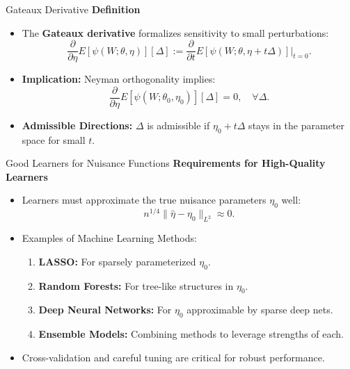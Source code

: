 \documentclass[xcolor=svgnames,t]{beamer}
\begin{document}
                        \begin{frame}{Gateaux Derivative}
                        \textbf{Definition}
                        \begin{itemize}
                            \item The \textbf{Gateaux derivative} formalizes sensitivity to small perturbations:
                            \[
                            \frac{\partial}{\partial \eta} E[\psi(W; \theta, \eta)][\Delta] := \frac{\partial}{\partial t} E[\psi(W; \theta, \eta + t\Delta)]\bigg|_{t=0}.
                            \]
                            \pause
                            \item \textbf{Implication:} Neyman orthogonality implies:
                            \[
                            \frac{\partial}{\partial \eta} E[\psi(W; \theta_0, \eta_0)][\Delta] = 0, \quad \forall \Delta.
                            \]
                            \pause
                            \item \textbf{Admissible Directions:} \(\Delta\) is admissible if \(\eta_0 + t\Delta\) stays in the parameter space for small \(t\).
                        \end{itemize}
                        \end{frame}
                        
                        \begin{frame}{Good Learners for Nuisance Functions}
                        \textbf{Requirements for High-Quality Learners}
                        \begin{itemize}
                            \item Learners must approximate the true nuisance parameters \(\eta_0\) well:
                            \[
                            n^{1/4} \|\hat{\eta} - \eta_0\|_{L^2} \approx 0.
                            \]
                            \pause
                            \item Examples of Machine Learning Methods:
                            \begin{enumerate}
                                \item \textbf{LASSO:} For sparsely parameterized \(\eta_0\).
                                \item \textbf{Random Forests:} For tree-like structures in \(\eta_0\).
                                \item \textbf{Deep Neural Networks:} For \(\eta_0\) approximable by sparse deep nets.
                                \item \textbf{Ensemble Models:} Combining methods to leverage strengths of each.
                            \end{enumerate}
                            \pause
                            \item Cross-validation and careful tuning are critical for robust performance.
                        \end{itemize}
                        \end{frame}
                        
\end{document}

